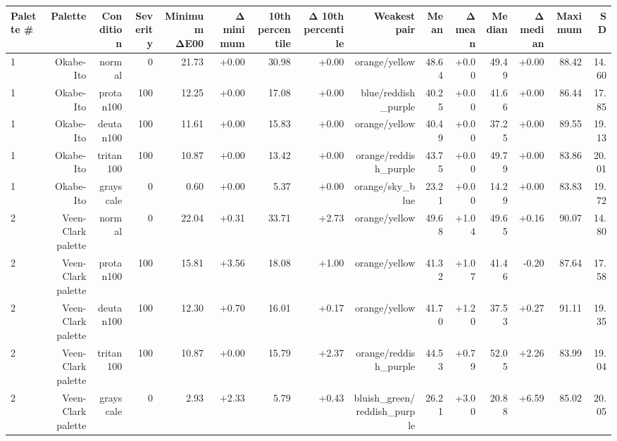 \begin{tabular}{lrrrrrrrrrrrrrr}
\toprule
Palette \# & Palette & Condition & Severity & Minimum ΔE00 & Δ minimum & 10th percentile & Δ 10th percentile & Weakest pair & Mean & Δ mean & Median & Δ median & Maximum & SD \\
\midrule
1 & Okabe-Ito & normal & 0 & 21.73 & +0.00 & 30.98 & +0.00 & orange/yellow & 48.64 & +0.00 & 49.49 & +0.00 & 88.42 & 14.60 \\
1 & Okabe-Ito & protan100 & 100 & 12.25 & +0.00 & 17.08 & +0.00 & blue/reddish\_purple & 40.25 & +0.00 & 41.66 & +0.00 & 86.44 & 17.85 \\
1 & Okabe-Ito & deutan100 & 100 & 11.61 & +0.00 & 15.83 & +0.00 & orange/yellow & 40.49 & +0.00 & 37.25 & +0.00 & 89.55 & 19.13 \\
1 & Okabe-Ito & tritan100 & 100 & 10.87 & +0.00 & 13.42 & +0.00 & orange/reddish\_purple & 43.75 & +0.00 & 49.79 & +0.00 & 83.86 & 20.01 \\
1 & Okabe-Ito & grayscale & 0 & 0.60 & +0.00 & 5.37 & +0.00 & orange/sky\_blue & 23.21 & +0.00 & 14.29 & +0.00 & 83.83 & 19.72 \\
2 & Veen-Clark palette & normal & 0 & 22.04 & +0.31 & 33.71 & +2.73 & orange/yellow & 49.68 & +1.04 & 49.65 & +0.16 & 90.07 & 14.80 \\
2 & Veen-Clark palette & protan100 & 100 & 15.81 & +3.56 & 18.08 & +1.00 & orange/yellow & 41.32 & +1.07 & 41.46 & -0.20 & 87.64 & 17.58 \\
2 & Veen-Clark palette & deutan100 & 100 & 12.30 & +0.70 & 16.01 & +0.17 & orange/yellow & 41.70 & +1.20 & 37.53 & +0.27 & 91.11 & 19.35 \\
2 & Veen-Clark palette & tritan100 & 100 & 10.87 & +0.00 & 15.79 & +2.37 & orange/reddish\_purple & 44.53 & +0.79 & 52.05 & +2.26 & 83.99 & 19.04 \\
2 & Veen-Clark palette & grayscale & 0 & 2.93 & +2.33 & 5.79 & +0.43 & bluish\_green/reddish\_purple & 26.21 & +3.00 & 20.88 & +6.59 & 85.02 & 20.05 \\
\bottomrule
\end{tabular}
